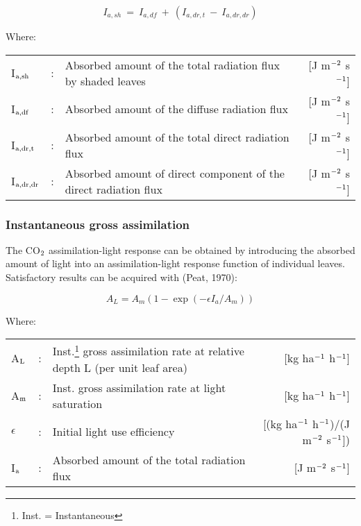 \begin{equation}
I _{a,sh} ~=~ I _{a,df} ~+~ (I_{a,dr,t} ~-~ I_{a,dr,dr} )
\end{equation}

Where:\\[5pt]
\begin{tabularx}{\textwidth}{llXr}
I$_{{\rm a,sh}}$ &:& Absorbed amount of the total radiation flux by shaded leaves    &    [J m$^{{\rm -2}}$ s$^{{\rm -1}}$]\\
I$_{{\rm a,df}}$ &:& Absorbed amount of the diffuse radiation flux   &     [J m$^{{\rm -2}}$ s$^{{\rm -1}}$]\\
I$_{{\rm a,dr,t}}$ &:& Absorbed amount of the total direct radiation flux   &     [J m$^{{\rm -2}}$ s$^{{\rm -1}}$]\\
I$_{{\rm a,dr,dr}}$ &:& Absorbed amount of direct component of the  direct radiation flux & [J m$^{{\rm -2}}$ s$^{{\rm -1}}$]\\
\end{tabularx}


\subsubsection{Instantaneous gross assimilation}
The CO$_{{\rm 2}}$ assimilation-light response can be obtained by introducing the absorbed amount
of light into an assimilation-light response function of individual leaves. Satisfactory
results can be acquired with (Peat, 1970):

\begin{equation}
A_{L} = A_{m} (1-\exp({{-\epsilon I_{a}}/{A_{m}}}))
\end{equation}

Where:\\[5pt]
\begin{tabularx}{\textwidth}{llXr}
A$_{{\rm L}}$ &:& Inst.\footnote{ Inst. = Instantaneous} gross assimilation 
     rate at relative depth L (per unit leaf area)    &    
     [kg ha$^{{\rm -1}}$ h$^{{\rm -1}}$]\\
A$_{{\rm m}}$ &:& Inst. gross assimilation rate at light saturation    & 
     [kg ha$^{{\rm -1}}$ h$^{{\rm -1}}$]\\
$\epsilon$ &:& Initial light use efficiency   &   [(kg ha$^{{\rm -1}}$ 
     h$^{{\rm -1}}$)/(J m$^{{\rm -2}}$ s$^{{\rm -1}}$])\\
I$_{{\rm a}}$ &:& Absorbed amount of the total radiation flux     &   
     [J m$^{{\rm -2}}$ s$^{{\rm -1}}$]\\
\end{tabularx}

